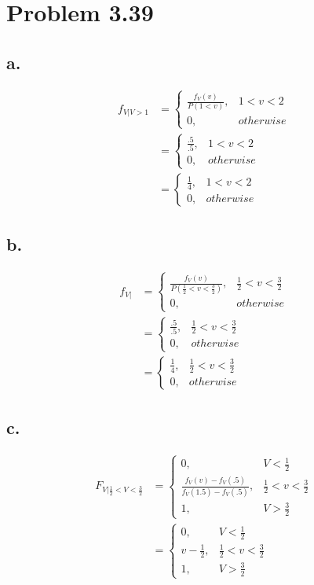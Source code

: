 \documentclass[12pt]{article}
\begin{document}
\section*{Problem 3.39}
\subsection*{a.}
\begin{align*}
  f_{V|V>1} &= \begin{cases} 
     \frac{f_V(v)}{P(1<v)}, & 1 < v < 2 \\
        0, & otherwise 
     \end{cases} \\
    &= \begin{cases} 
      \frac{.5}{.5}, & 1 < v < 2 \\
        0, & otherwise 
      \end{cases} \\
    &= \begin{cases} 
      \frac{1}{4}, & 1 < v < 2 \\
        0, & otherwise 
      \end{cases}
\end{align*}
\subsection*{b.}
\begin{align*}
  f_{V|} &= \begin{cases} 
    \frac{f_V(v)}{P(\frac{1}{2}<v<\frac{3}{2})}, & \frac{1}{2}<v<\frac{3}{2} \\
        0, & otherwise 
     \end{cases} \\
    &= \begin{cases} 
      \frac{.5}{.5}, & \frac{1}{2}<v<\frac{3}{2} \\
        0, & otherwise 
      \end{cases} \\
    &= \begin{cases} 
      \frac{1}{4}, & \frac{1}{2}<v<\frac{3}{2} \\
        0, & otherwise 
      \end{cases}
\end{align*}
\subsection*{c.}
\begin{align*}
  F_{V|\frac{1}{2}<V<\frac{3}{2}} &= 
  \begin{cases} 
    0, & V<\frac{1}{2} \\
    \frac{f_V(v) - f_V(.5)}{f_V(1.5) - f_V(.5)}, & \frac{1}{2}<v<\frac{3}{2} \\
    1, & V>\frac{3}{2}
  \end{cases} \\
 &= \begin{cases} 
    0, & V<\frac{1}{2} \\
    v-\frac{1}{2}, & \frac{1}{2}<v<\frac{3}{2} \\
    1, & V>\frac{3}{2}
  \end{cases}  
\end{align*}
\end{document}
